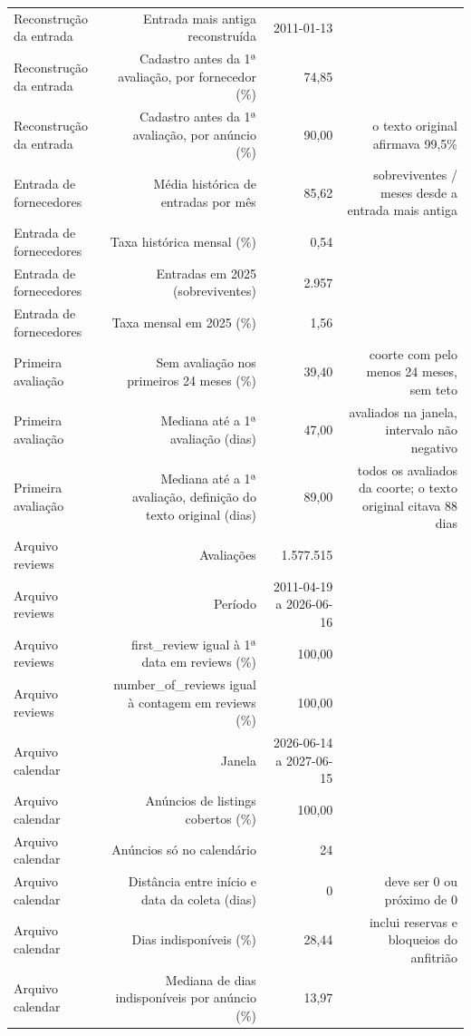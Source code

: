 \begin{table}[ht]
\begin{tabular}{lrrr}
Reconstrução da entrada & Entrada mais antiga reconstruída & 2011-01-13 &  \\
Reconstrução da entrada & Cadastro antes da 1ª avaliação, por fornecedor (\%) & 74,85 &  \\
Reconstrução da entrada & Cadastro antes da 1ª avaliação, por anúncio (\%) & 90,00 & o texto original afirmava 99,5\% \\
Entrada de fornecedores & Média histórica de entradas por mês & 85,62 & sobreviventes / meses desde a entrada mais antiga \\
Entrada de fornecedores & Taxa histórica mensal (\%) & 0,54 &  \\
Entrada de fornecedores & Entradas em 2025 (sobreviventes) & 2.957 &  \\
Entrada de fornecedores & Taxa mensal em 2025 (\%) & 1,56 &  \\
Primeira avaliação & Sem avaliação nos primeiros 24 meses (\%) & 39,40 & coorte com pelo menos 24 meses, sem teto \\
Primeira avaliação & Mediana até a 1ª avaliação (dias) & 47,00 & avaliados na janela, intervalo não negativo \\
Primeira avaliação & Mediana até a 1ª avaliação, definição do texto original (dias) & 89,00 & todos os avaliados da coorte; o texto original citava 88 dias \\
Arquivo reviews & Avaliações & 1.577.515 &  \\
Arquivo reviews & Período & 2011-04-19 a 2026-06-16 &  \\
Arquivo reviews & first\_review igual à 1ª data em reviews (\%) & 100,00 &  \\
Arquivo reviews & number\_of\_reviews igual à contagem em reviews (\%) & 100,00 &  \\
Arquivo calendar & Janela & 2026-06-14 a 2027-06-15 &  \\
Arquivo calendar & Anúncios de listings cobertos (\%) & 100,00 &  \\
Arquivo calendar & Anúncios só no calendário & 24 &  \\
Arquivo calendar & Distância entre início e data da coleta (dias) & 0 & deve ser 0 ou próximo de 0 \\
Arquivo calendar & Dias indisponíveis (\%) & 28,44 & inclui reservas e bloqueios do anfitrião \\
Arquivo calendar & Mediana de dias indisponíveis por anúncio (\%) & 13,97 &  \\
\hline
\end{tabular}
\end{table}
